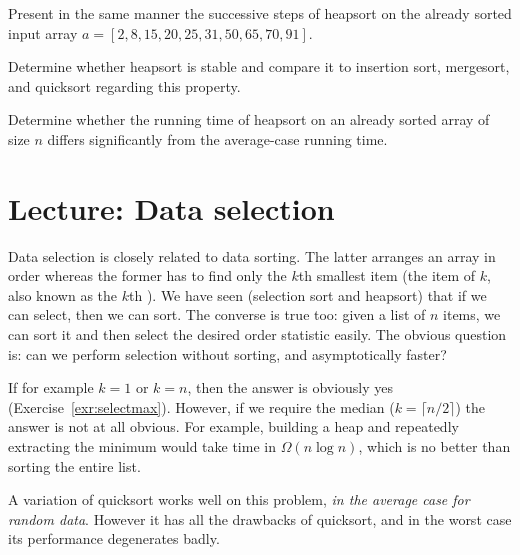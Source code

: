 \begin{Exercise}\label{exr:hsort:apply} 
Present in the same manner the successive steps of heapsort on
the already sorted input array 
\(a=[2, 8, 15, 20, 25, 31, 50, 65, 70, 91]\).
\end{Exercise}

\begin{Exercise}\label{exr:hsort:stable}
Determine whether heapsort is stable and compare it to insertion sort,
mergesort, and quicksort regarding this property. 
\end{Exercise}

\begin{Exercise}\label{exr:heapsort:sorted:already}
Determine whether the running time of heapsort on an already sorted array of 
size \(n\) differs significantly from the average-case running time.
\end{Exercise}


\chapter{Lecture: Data selection} \label{sec:qselect}
Data selection is closely related to data sorting. The latter arranges
an array in order whereas the former has to find only the $k$th smallest item 
(the item of  \(k\), also known as the 
$k$th ). We have seen (selection sort and heapsort) 
that if we can select, then we can sort. The converse is true too: 
given a list of $n$ items, we can sort it and then select the desired order 
statistic easily. The obvious question is: can we perform selection without sorting, 
and asymptotically faster?

If for example $k=1$ or $k=n$, then the answer is obviously yes 
(Exercise~\ref{exr:selectmax}). However, if we require the median 
($k=\lceil n/2 \rceil$) the answer is not at all obvious. For example, building 
a heap and repeatedly extracting the minimum would take time in 
$\Omega(n\log n)$, which is no better than sorting the entire list.

A variation of quicksort works well on this problem, \emph{in the average case for random 
data}. However it has all the drawbacks of quicksort, and in the worst case its 
performance degenerates badly.


